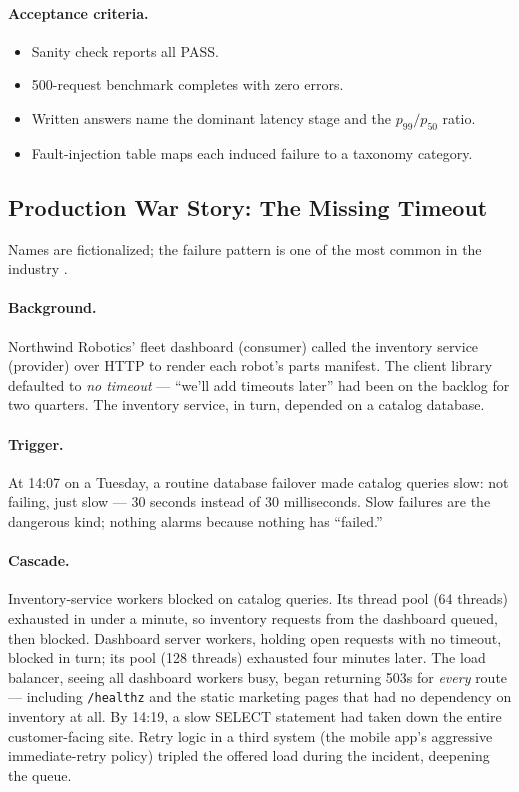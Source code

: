 \paragraph{Acceptance criteria.}
\begin{itemize}
  \item[$\square$] Sanity check reports all PASS.
  \item[$\square$] 500-request benchmark completes with zero errors.
  \item[$\square$] Written answers name the dominant latency stage and the
    $p_{99}/p_{50}$ ratio.
  \item[$\square$] Fault-injection table maps each induced failure to a
    taxonomy category.
\end{itemize}

\subsection{Production War Story: The Missing Timeout}
\label{sec:ch0-warstory}

Names are fictionalized; the failure pattern is one of the most common in the
industry \cite{nygard2018releaseit}.

\paragraph{Background.}
Northwind Robotics' fleet dashboard (consumer) called the inventory service
(provider) over HTTP to render each robot's parts manifest. The client
library defaulted to \emph{no timeout} --- ``we'll add timeouts later'' had
been on the backlog for two quarters. The inventory service, in turn,
depended on a catalog database.

\paragraph{Trigger.}
At 14:07 on a Tuesday, a routine database failover made catalog queries slow:
not failing, just slow --- 30 seconds instead of 30 milliseconds. Slow
failures are the dangerous kind; nothing alarms because nothing has
``failed.''

\paragraph{Cascade.}
Inventory-service workers blocked on catalog queries. Its thread pool (64
threads) exhausted in under a minute, so inventory requests from the
dashboard queued, then blocked. Dashboard server workers, holding open
requests with no timeout, blocked in turn; its pool (128 threads) exhausted
four minutes later. The load balancer, seeing all dashboard workers busy,
began returning 503s for \emph{every} route --- including
\texttt{/healthz} and the static marketing pages that had no dependency on
inventory at all. By 14:19, a slow SELECT statement had taken down the
entire customer-facing site. Retry logic in a third system (the mobile app's
aggressive immediate-retry policy) tripled the offered load during the
incident, deepening the queue.

